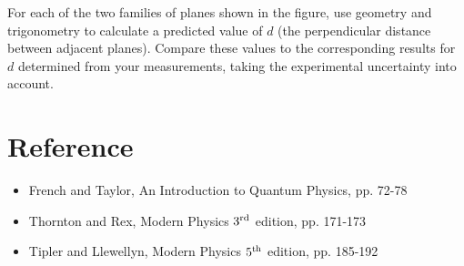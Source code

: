 \begin{enumerate}
For each of the two families of planes shown in the figure, use geometry
and trigonometry to calculate a predicted value of $d$ (the perpendicular
distance between adjacent planes).  Compare these values to the
corresponding results for $d$ determined from your measurements, taking
the experimental uncertainty into account.

\end{enumerate}

\section{Reference}
\begin{itemize}
\item French and Taylor, An Introduction to Quantum Physics, pp. 72-78
\item Thornton and Rex, Modern Physics $3^{\rm rd}$ edition, pp. 171-173
\item Tipler and Llewellyn, Modern Physics $5^{\rm th}$ edition, pp. 185-192
\end{itemize}
